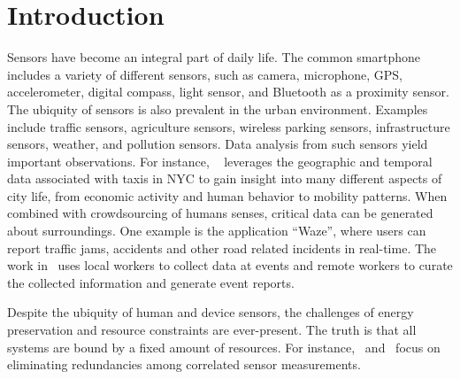 \documentclass{acm_proc_article-sp}
\begin{document}
\section{Introduction}
Sensors have become an integral part of daily life. The common smartphone includes a variety of different sensors, such as camera, microphone, GPS, accelerometer, digital compass, light sensor, and Bluetooth as a proximity sensor. The ubiquity of sensors is also prevalent in the urban environment. Examples include traffic sensors, agriculture sensors, wireless parking sensors, infrastructure sensors, weather, and pollution sensors. Data analysis from such sensors yield important observations. For instance, ~\cite{ferreira2013visual} leverages the geographic and temporal data associated with taxis in NYC to gain insight into many different aspects of city life, from economic activity and human behavior to mobility patterns. When combined with crowdsourcing of humans senses, critical data can be generated about surroundings. One example is the application ``Waze'', where users can report traffic jams, accidents and other road related incidents in real-time. The work in~\cite{agapie2015crowdsourcing} uses local workers to collect data at events and remote workers to curate the collected information and generate event reports.\par

Despite the ubiquity of human and device sensors, the challenges of energy preservation and resource constraints are ever-present. The truth is that all systems are bound by a fixed amount of resources. For instance,~\cite{marco2003many} and~\cite{pattem2008impact} focus on eliminating redundancies among correlated sensor measurements. \par
\end{document}
